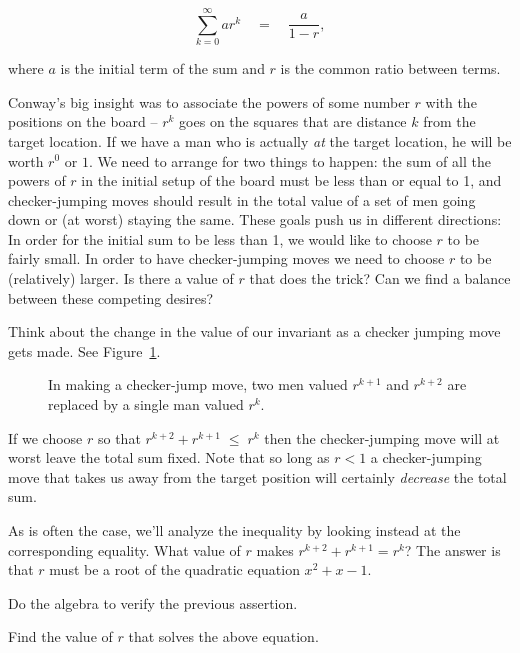\[ \sum_{k=0}^{\infty} ar^k  \quad = \quad \frac{a}{1-r}, \]

\noindent where $a$ is the initial term of the sum and $r$ is the common
ratio between terms.

Conway's big insight was to associate the powers of some number $r$ with
the positions on the board -- $r^k$ goes on the squares that are distance
$k$ from the target location.  If we have a man who is actually {\em at}
the target location, he will be worth $r^0$ or $1$.  We need to arrange for
two things to happen:  the sum of all the powers of $r$ in the initial setup
of the board must be less than or equal to 1, and checker-jumping moves should
result in the total value of a set of men going down or (at worst) staying 
the same.  These goals push us in different directions:  In order for the initial sum to be less
than 1, we would like to choose $r$ to be fairly small.  In order to have checker-jumping moves we need to choose $r$ to be (relatively) larger.  Is there a value of $r$ that does the trick?  Can we find a balance between these competing 
desires?

Think about the change in the value of our invariant as a checker jumping 
move gets made.  See Figure~\ref{fig:finding_r}.
 
\begin{figure}[!hbtp] 
\begin{center}

\end{center}
\caption[Finding $r$.]{In making a checker-jump move, two men valued $r^{k+1}$ and $r^{k+2}$ are replaced by a single man valued $r^k$.}
\label{fig:finding_r}
\end{figure}
 
If we choose $r$ so that $r^{k+2} + r^{k+1} \; \leq \; r^k$ then the 
checker-jumping move will at worst leave the total sum fixed.  Note that
so long as $r<1$ a checker-jumping move that takes us away from the target 
position will certainly {\em decrease} the total sum.

As is often the case, we'll analyze the inequality by looking instead at the
corresponding equality.  What value of $r$ makes  $r^{k+2} + r^{k+1}  =  r^k$?
The answer is that $r$ must be a root of the quadratic equation $x^2+x-1$.

\begin{exer}
Do the algebra to verify the previous assertion.
\end{exer}

\begin{exer}
Find the value of $r$ that solves the above equation. 
\end{exer}

